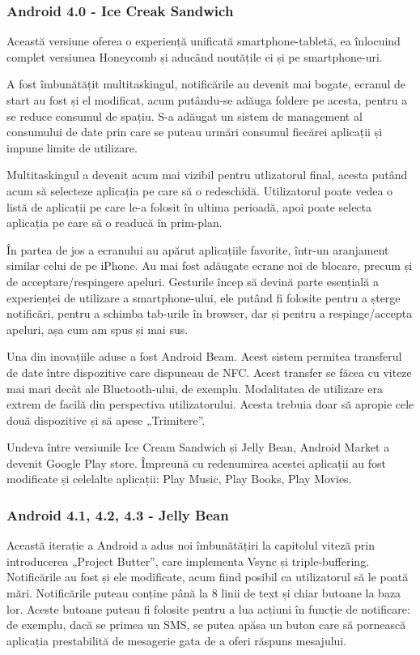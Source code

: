 \documentclass[12pt,a4paper]{article}
\begin{document}
\subsubsection{Android 4.0 - Ice Creak Sandwich}
Această versiune oferea o experiență unificată smartphone-tabletă, ea înlocuind complet versiunea Honeycomb și aducând noutățile ei și pe smartphone-uri.

	A fost îmbunătățit multitaskingul, notificările au devenit mai bogate, ecranul de start au fost și el modificat, acum putându-se adăuga foldere pe acesta, pentru a se reduce consumul de spațiu. S-a adăugat un sistem de management al consumului de date prin care se puteau urmări consumul fiecărei aplicații și impune limite de utilizare.

	Multitaskingul a devenit acum mai vizibil pentru utlizatorul final, acesta putând acum să selecteze aplicația pe care să o redeschidă. Utilizatorul poate vedea o listă de aplicații pe care le-a folosit în ultima perioadă, apoi poate selecta aplicația pe care să o readucă în prim-plan.

	În partea de jos a ecranului au apărut aplicațiile favorite, într-un aranjament similar celui de pe iPhone. Au mai fost adăugate ecrane noi de blocare, precum și de acceptare/respingere apeluri. Gesturile încep să devină parte esențială a experienței de utilizare a smartphone-ului, ele putând fi folosite pentru a șterge notificări, pentru a schimba tab-urile în browser, dar și pentru a respinge/accepta apeluri, așa cum am spus și mai sus.

	Una din inovațiile aduse a fost Android Beam. Acest sistem permitea transferul de date între dispozitive care dispuneau de NFC. Acest transfer se făcea cu viteze mai mari decât ale Bluetooth-ului, de exemplu. Modalitatea de utilizare era extrem de facilă din perspectiva utilizatorului. Acesta trebuia doar să apropie cele două dispozitive și să apese „Trimitere”.

	Undeva între versiunile Ice Cream Sandwich și Jelly Bean, Android Market a devenit Google Play store. Împreună cu redenumirea acestei aplicații au fost modificate și celelalte aplicații: Play Music, Play Books, Play Movies.


\subsubsection{Android 4.1, 4.2, 4.3 - Jelly Bean}
Această iterație a Android a adus noi îmbunătățiri la capitolul viteză prin introducerea „Project Butter”, care implementa Vsync și triple-buffering. Notificările au fost și ele modificate, acum fiind posibil ca utilizatorul să le poată mări. Notificările puteau conține până la 8 linii de text și chiar butoane la baza lor. Aceste butoane puteau fi folosite pentru a lua acțiuni în funcție de notificare: de exemplu, dacă se primea un SMS, se putea apăsa un buton care să pornească aplicația prestabilită de mesagerie gata de a oferi răspuns mesajului.
\end{document}
